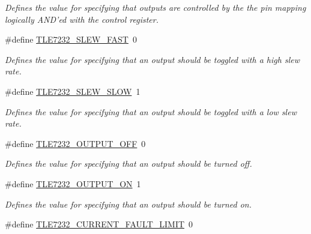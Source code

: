 \begin{DoxyCompactItemize}
\begin{DoxyCompactList}\small\item\em Defines the value for specifying that outputs are controlled by the the pin mapping logically A\-N\-D'ed with the control register. \end{DoxyCompactList}\item 
\hypertarget{group__tle7232__driver_ga9969132fe427bf6d85708a045041d349}{\#define \hyperlink{group__tle7232__driver_ga9969132fe427bf6d85708a045041d349}{T\-L\-E7232\-\_\-\-S\-L\-E\-W\-\_\-\-F\-A\-S\-T}~0}\label{group__tle7232__driver_ga9969132fe427bf6d85708a045041d349}

\begin{DoxyCompactList}\small\item\em Defines the value for specifying that an output should be toggled with a high slew rate. \end{DoxyCompactList}\item 
\hypertarget{group__tle7232__driver_gaafc5605a1d7f50da7eabc93169f965c9}{\#define \hyperlink{group__tle7232__driver_gaafc5605a1d7f50da7eabc93169f965c9}{T\-L\-E7232\-\_\-\-S\-L\-E\-W\-\_\-\-S\-L\-O\-W}~1}\label{group__tle7232__driver_gaafc5605a1d7f50da7eabc93169f965c9}

\begin{DoxyCompactList}\small\item\em Defines the value for specifying that an output should be toggled with a low slew rate. \end{DoxyCompactList}\item 
\hypertarget{group__tle7232__driver_gab886743dbb4204b8bd27b7495f9a8847}{\#define \hyperlink{group__tle7232__driver_gab886743dbb4204b8bd27b7495f9a8847}{T\-L\-E7232\-\_\-\-O\-U\-T\-P\-U\-T\-\_\-\-O\-F\-F}~0}\label{group__tle7232__driver_gab886743dbb4204b8bd27b7495f9a8847}

\begin{DoxyCompactList}\small\item\em Defines the value for specifying that an output should be turned off. \end{DoxyCompactList}\item 
\hypertarget{group__tle7232__driver_ga3d05c892163115f5ba5e87c4939ecb7f}{\#define \hyperlink{group__tle7232__driver_ga3d05c892163115f5ba5e87c4939ecb7f}{T\-L\-E7232\-\_\-\-O\-U\-T\-P\-U\-T\-\_\-\-O\-N}~1}\label{group__tle7232__driver_ga3d05c892163115f5ba5e87c4939ecb7f}

\begin{DoxyCompactList}\small\item\em Defines the value for specifying that an output should be turned on. \end{DoxyCompactList}\item 
\hypertarget{group__tle7232__driver_ga1cd67769a2ac03b866d2f891766e0af4}{\#define \hyperlink{group__tle7232__driver_ga1cd67769a2ac03b866d2f891766e0af4}{T\-L\-E7232\-\_\-\-C\-U\-R\-R\-E\-N\-T\-\_\-\-F\-A\-U\-L\-T\-\_\-\-L\-I\-M\-I\-T}~0}\label{group__tle7232__driver_ga1cd67769a2ac03b866d2f891766e0af4}


\end{DoxyCompactItemize}
